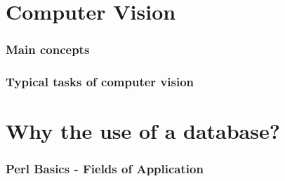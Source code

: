 \documentclass{beamer}
\begin{document}
\section{Computer Vision}

\begin{frame}
\frametitle{Main concepts}
\end{frame}
\begin{frame}
\frametitle{Typical tasks of computer vision}

\end{frame}
\section{Why the use of a database?}
\begin{frame}
\frametitle{}
\end{frame}
\begin{frame}
\frametitle{}
\end{frame}
\begin{frame}
\frametitle{Perl Basics - Fields of Application}

\end{frame}
\begin{frame}
\frametitle{}
\end{frame}
\begin{frame}
\frametitle{}
\end{frame}
\end{document}
